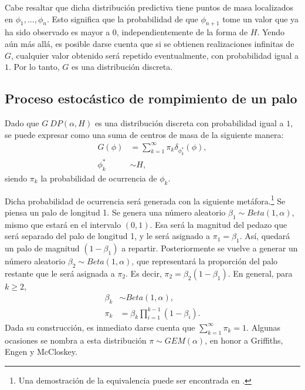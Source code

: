 Cabe resaltar que dicha distribuci\'on predictiva tiene puntos de masa localizados en $\phi_1,...,\phi_n$. Esto significa que la probabilidad de que $\phi_{n+1}$ tome un valor que ya ha sido observado es mayor a $0$, independientemente de la forma de $H$. Yendo a\'un m\'as all\'a, es posible darse cuenta que si se obtienen realizaciones infinitas de $G$, cualquier valor obtenido ser\'a repetido eventualmente, con probabilidad igual a $1$. Por lo tanto, $G$ es una distribuci\'on discreta.

\subsection{Proceso estoc\'astico de rompimiento de un palo}

Dado que $G ~ DP(\alpha,H)$  es una distribuci\'on discreta con probabilidad igual a $1$, se puede expresar como una suma de centros de masa de la siguiente manera:
\begin{equation*}
\begin{aligned}
G(\phi) &= \sum_{k=1}^\infty \pi_k \delta_{\phi_k^*}(\phi),\\
   \phi_k^* &\sim H,
\end{aligned}
\end{equation*}
siendo $\pi_k$ la probabilidad de ocurrencia de $\phi_k$.

Dicha probabilidad de ocurrencia ser\'a generada con la siguiente met\'afora.\footnote{Una demostraci\'on de la equivalencia puede ser encontrada en \cite{Paisley_SB}.} Se piensa un palo de longitud 1. Se genera una n\'umero aleatorio $\beta_1 \sim Beta(1,\alpha)$, mismo que estar\'a en el intervalo $(0,1)$. Esa ser\'a la magnitud del pedazo que ser\'a separado del palo de longitud 1, y le ser\'a asignado a $\pi_1 = \beta_1$. As\'i, quedar\'a un palo de magnitud $(1-\beta_1)$ a repartir. Posteriormente se vuelve a generar un n\'umero aleatorio $\beta_2 \sim Beta(1,\alpha)$, que representar\'a la proporci\'on del palo restante que le ser\'a asignada a $\pi_2$. Es decir, $\pi_2 = \beta_2(1-\beta_1)$. En general, para $k \geq 2$,
\begin{equation*}
\begin{aligned}
   \beta_k &\sim Beta(1,\alpha),\\
   \pi_k &= \beta_k \prod_{i=1}^{k-1}(1 - \beta_i).
\end{aligned}
\end{equation*}
Dada su construcci\'on, es inmediato darse cuenta que $\sum_{k=1}^\infty \pi_k = 1$. Algunas ocasiones se nombra a esta distribuci\'on $\pi \sim GEM(\alpha)$, en honor a Griffiths, Engen y McCloskey.

